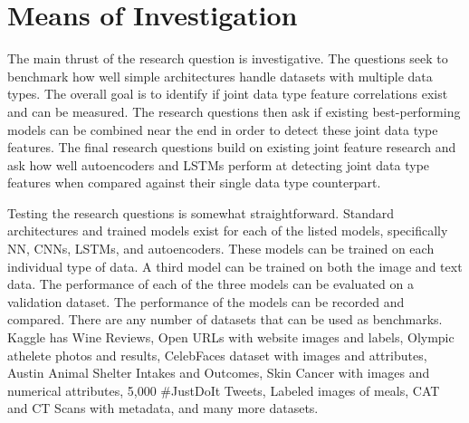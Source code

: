 \section{Means of Investigation} %

The main thrust of the research question is investigative.  The questions seek to benchmark how well simple architectures handle datasets with multiple data types. The overall goal is to identify if joint data type feature correlations exist and can be measured.  The research questions then ask if existing best-performing models can be combined near the end in order to detect these joint data type features.  The final research questions build on existing joint feature research and ask how well autoencoders and LSTMs perform at detecting joint data type features when compared against their single data type counterpart.

Testing the research questions is somewhat straightforward.  Standard architectures and trained models exist for each of the listed models, specifically NN, CNNs, LSTMs, and autoencoders. These models can be trained on each individual type of data.  A third model can be trained on both the image and text data.  The performance of each of the three models can be evaluated on a validation dataset.  The performance of the models can be recorded and compared.  There are any number of datasets that can be used as benchmarks.  Kaggle has Wine Reviews, Open URLs with website images and labels, Olympic athelete photos and results, CelebFaces dataset with images and attributes, Austin Animal Shelter Intakes and Outcomes, Skin Cancer with images and numerical attributes, 5,000 \#JustDoIt Tweets, Labeled images of meals, CAT and CT Scans with metadata, and many more datasets.  




